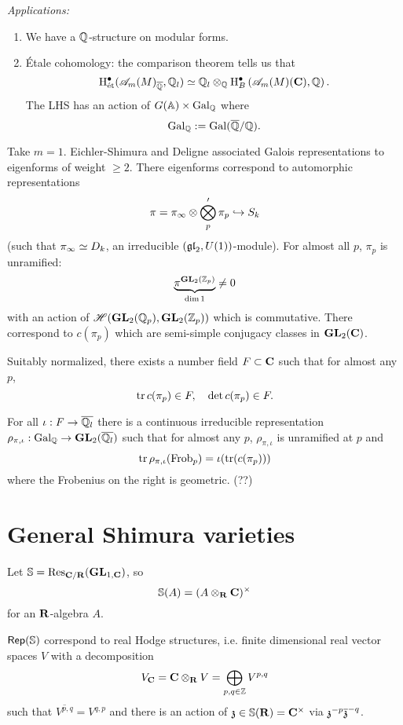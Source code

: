 \emph{Applications:}
\begin{enumerate}[1)]
	\item We have a $\mathbb Q$-structure on modular forms.
	\item \'Etale cohomology: the comparison theorem tells us that
		\[
			\mathrm{H}_{\text{\'et}}^{\bullet}(\mathscr{A}_m(M)_{\overline{\mathbb Q}}, \mathbb Q_l) \simeq \mathbb Q_l \otimes_{\mathbb Q}\mathrm{H}^{\bullet}_B\left( \mathscr{A}_m(M)(\mathbf{C}), \mathbb Q \right) .
		\] 
		The LHS has an action of $G(\mathbb A)\times \operatorname{Gal}_\mathbb Q$ where
		\[
		\operatorname{Gal}_\mathbb Q := \operatorname{Gal}(\overline{\mathbb Q} /\mathbb Q).
		\] 
\end{enumerate}
\begin{example}
	Take $m=1$. Eichler-Shimura and Deligne associated Galois representations to eigenforms of weight $\ge 2$. There eigenforms correspond to automorphic representations
	\[
	\pi = \pi_{\infty}\otimes \bigotimes_p' \pi_{p} \hookrightarrow S_k
	\] 
	(such that $\pi_{\infty}\simeq D_k$, an irreducible $(\mathfrak{gl}_2,U(1))$-module). For almost all $p$, $\pi_p$ is unramified: 
	\[
		\underbrace{\pi^{\mathbf{GL}_2(\mathbb Z_p)}}_{\dim 1} \neq 0
	\] 
	with an action of $\mathscr{H}(\mathbf{GL}_2(\mathbb Q_p),\mathbf{GL}_2(\mathbb Z_p))$ which is commutative. There correspond to $c(\pi_p)$ which are semi-simple conjugacy classes in $\mathbf{GL}_2(\mathbf{C})$.

	Suitably normalized, there exists a number field $F\subset \mathbf{C}$ such that for almost any $p$,
	\[
	\operatorname{tr} c(\pi_p)\in F,\quad \operatorname{det} c(\pi_p)\in F.
	\] 
\end{example}
\begin{theorem}
	For all $\iota:F\to \overline{\Q_l}$ there is a continuous irreducible representation $\rho_{\pi,\iota}:\Gal_\Q\to \GL_2(\overline{\Q_l})$ such that for almost any $p$, $\rho_{\pi,\iota}$ is unramified at $p$ and
	\[
	\operatorname{tr} \rho_{\pi,\iota}(\operatorname{Frob}_p) = \iota(\operatorname{tr}(c(\pi_p)))
	\] 
	where the Frobenius on the right is geometric. (??)
\end{theorem}

\section{General Shimura varieties}
\begin{definition}
	Let $\mathbb{S} = \operatorname{Res}_{\mathbf{C} /\mathbf{R}}(\mathbf{GL}_{1,\mathbf{C}})$, so
	\[
		\mathbb{S}(A) = (A\otimes_\mathbf{R}\mathbf{C})^{\times }
	\] 
	for an $\mathbf{R}$-algebra $A$.
\end{definition}
$\mathsf{Rep}(\mathbb{S})$ correspond to real Hodge structures, i.e. finite dimensional real vector spaces $V$ with a decomposition
\[
	V_{\mathbf{C}}=\mathbf{C}\otimes_\mathbf{R} V = \bigoplus_{p,q\in \mathbb Z}V^{p,q}
\] 
such that $\overline{V^{p,q}} = V^{q,p}$ and there is an action of $\mathfrak{z}\in \mathbb{S}(\mathbf{R})=\mathbf{C}^{\times }$ via $\mathfrak{z}^{-p}\overline{\mathfrak{z}}^{-q}$.

